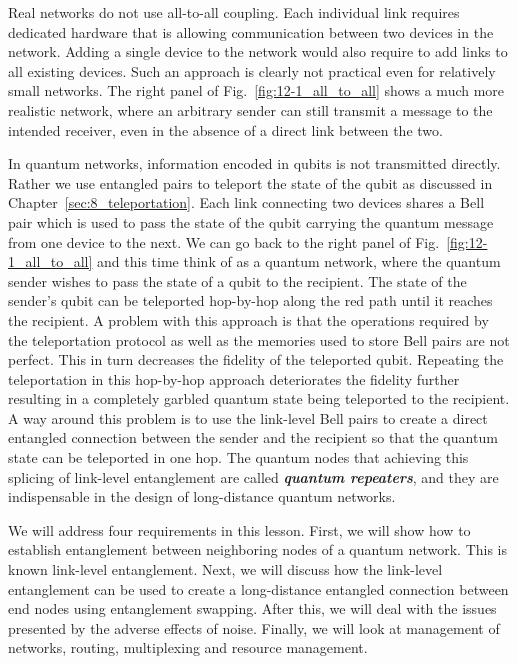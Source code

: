 Real networks do not use all-to-all coupling.
Each individual link requires dedicated hardware that is allowing communication between two devices in the network.
Adding a single device to the network would also require to add links to all existing devices.
Such an approach is clearly not practical even for relatively small networks.
The right panel of Fig.~\ref{fig:12-1_all_to_all} shows a much more realistic network, where an arbitrary sender can still transmit a message to the intended receiver, even in the absence of a direct link between the two.

In quantum networks, information encoded in qubits is not transmitted directly.
Rather we use entangled pairs to teleport the state of the qubit as discussed in Chapter~\ref{sec:8_teleportation}.
Each link connecting two devices shares a Bell pair which is used to pass the state of the qubit carrying the quantum message from one device to the next.
We can go back to the right panel of Fig.~\ref{fig:12-1_all_to_all} and this time think of as a quantum network, where the quantum sender wishes to pass the state of a qubit to the recipient.
The state of the sender's qubit can be teleported hop-by-hop along the red path until it reaches the recipient.
A problem with this approach is that the operations required by the teleportation protocol as well as the memories used to store Bell pairs are not perfect.
This in turn decreases the fidelity of the teleported qubit.
Repeating the teleportation in this hop-by-hop approach deteriorates the fidelity further resulting in a completely garbled quantum state being teleported to the recipient.
A way around this problem is to use the link-level Bell pairs to create a direct entangled connection between the sender and the recipient so that the quantum state can be teleported in one hop.
The quantum nodes that achieving this splicing of link-level entanglement are called \textit{\textbf{quantum repeaters}}, and they are indispensable in the design of long-distance quantum networks.

We will address four requirements in this lesson.
First, we will show how to establish entanglement between neighboring nodes of a quantum network. This is known link-level entanglement.
Next, we will discuss how the link-level entanglement can be used to create a long-distance entangled connection between end nodes using entanglement swapping.
After this, we will deal with the issues presented by the adverse effects of noise.
Finally, we will look at management of networks, routing, multiplexing and resource management.


